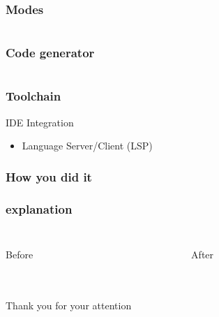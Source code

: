 \documentclass{beamer}
\begin{document}
\begin{frame}
\frametitle{Modes}
\inputminted{swift}{code/modes.flint}
\end{frame}


\begin{frame}
\frametitle{Code generator}
\inputminted[fontsize=\tiny]{swift}{code/codegen.flint}
\end{frame}

\begin{frame}
\frametitle{Toolchain}
\begin{block}{IDE Integration}
	{\tiny
	\begin{itemize}
		\item Language Server/Client (LSP)
	\end{itemize}
	}
\end{block}
\end{frame}



\begin{frame}
\frametitle{How you did it}

\end{frame}

\begin{frame}
\frametitle{explanation}
\begin{columns}
\begin{column}{0.5\textwidth}
	\inputminted{swift}{code/example.flont}
	Before
\end{column}
\begin{column}{0.5\textwidth}  %
	\inputminted{swift}{code/example.flint}
	After
\end{column}
\end{columns}
\end{frame}

\section*{ }
\begin{frame}
 	\vbox{}
	\begin{centering}
	{\LARGE {} Thank you for your attention}
	\par
	\end{centering}
\end{frame}
\end{document}

